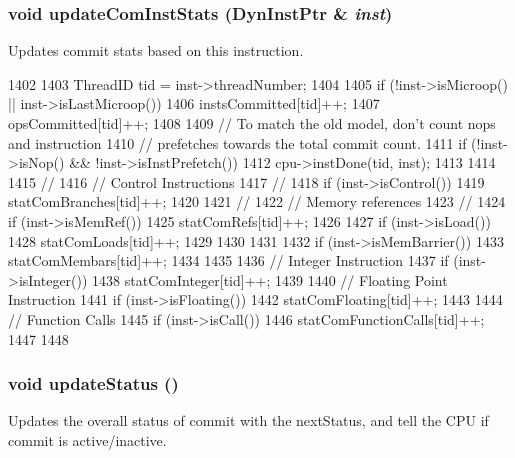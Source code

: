 \hypertarget{classDefaultCommit_a5bbf266cb0cc97eed138c8fe0d2d76b6}{
\subsubsection[{updateComInstStats}]{\setlength{\rightskip}{0pt plus 5cm}void updateComInstStats ({\bf DynInstPtr} \& {\em inst})}}
\label{classDefaultCommit_a5bbf266cb0cc97eed138c8fe0d2d76b6}
Updates commit stats based on this instruction. 


\begin{DoxyCode}
1402 {
1403     ThreadID tid = inst->threadNumber;
1404 
1405     if (!inst->isMicroop() || inst->isLastMicroop())
1406         instsCommitted[tid]++;
1407     opsCommitted[tid]++;
1408 
1409     // To match the old model, don't count nops and instruction
1410     // prefetches towards the total commit count.
1411     if (!inst->isNop() && !inst->isInstPrefetch()) {
1412         cpu->instDone(tid, inst);
1413     }
1414 
1415     //
1416     //  Control Instructions
1417     //
1418     if (inst->isControl())
1419         statComBranches[tid]++;
1420 
1421     //
1422     //  Memory references
1423     //
1424     if (inst->isMemRef()) {
1425         statComRefs[tid]++;
1426 
1427         if (inst->isLoad()) {
1428             statComLoads[tid]++;
1429         }
1430     }
1431 
1432     if (inst->isMemBarrier()) {
1433         statComMembars[tid]++;
1434     }
1435 
1436     // Integer Instruction
1437     if (inst->isInteger())
1438         statComInteger[tid]++;
1439 
1440     // Floating Point Instruction
1441     if (inst->isFloating())
1442         statComFloating[tid]++;
1443 
1444     // Function Calls
1445     if (inst->isCall())
1446         statComFunctionCalls[tid]++;
1447 
1448 }
\end{DoxyCode}
\hypertarget{classDefaultCommit_a4bb9486757ce225941aaaf759b357a57}{
\subsubsection[{updateStatus}]{\setlength{\rightskip}{0pt plus 5cm}void updateStatus ()}}
\label{classDefaultCommit_a4bb9486757ce225941aaaf759b357a57}
Updates the overall status of commit with the nextStatus, and tell the CPU if commit is active/inactive. 


